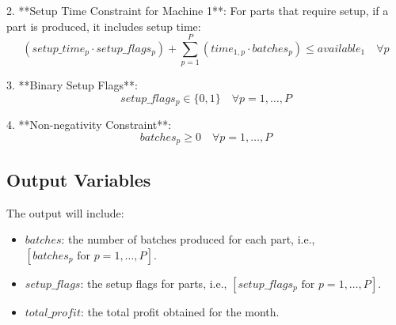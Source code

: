 \documentclass{article}
\begin{document}
2. **Setup Time Constraint for Machine 1**:
   For parts that require setup, if a part is produced, it includes setup time:
   \[
   (setup\_time_{p} \cdot setup\_flags_{p}) + \sum_{p=1}^{P} (time_{1,p} \cdot batches_{p}) \leq available_{1} \quad \forall p
   \]

3. **Binary Setup Flags**:
   \[
   setup\_flags_{p} \in \{0, 1\} \quad \forall p = 1, \ldots, P
   \]

4. **Non-negativity Constraint**:
   \[
   batches_{p} \geq 0 \quad \forall p = 1, \ldots, P
   \]

\subsection*{Output Variables}
The output will include:
\begin{itemize}
    \item \( batches \): the number of batches produced for each part, i.e., \( [batches_{p} \text{ for } p = 1, \ldots, P] \).
    \item \( setup\_flags \): the setup flags for parts, i.e., \( [setup\_flags_{p} \text{ for } p = 1, \ldots, P] \).
    \item \( total\_profit \): the total profit obtained for the month.
\end{itemize}
\end{document}
